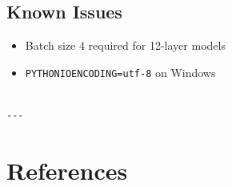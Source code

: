 \subsection{Known Issues}

\begin{itemize}
\item Batch size 4 required for 12-layer models
\item \texttt{PYTHONIOENCODING=utf-8} on Windows
\end{itemize}
\begin{lstlisting}

---
\end{lstlisting}

\section{References}

